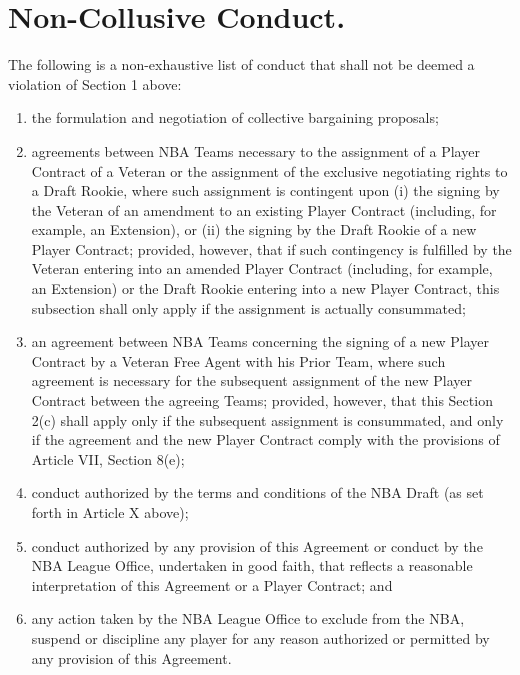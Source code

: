 \documentclass[
]{book}
\providecommand{\tightlist}{%
  \setlength{\itemsep}{0pt}\setlength{\parskip}{0pt}}
\begin{document}
\hypertarget{non-collusive-conduct.}{%
\section{Non-Collusive Conduct.}\label{non-collusive-conduct.}}

The following is a non-exhaustive list of conduct that shall not be deemed a violation of Section 1 above:

\begin{enumerate}
\def\labelenumi{(\alph{enumi})}
\tightlist
\item
  the formulation and negotiation of collective bargaining proposals;
\item
  agreements between NBA Teams necessary to the assignment of a Player Contract of a Veteran or the assignment of the exclusive negotiating rights to a Draft Rookie, where such assignment is contingent upon (i) the signing by the Veteran of an amendment to an existing Player Contract (including, for example, an Extension), or (ii) the signing by the Draft Rookie of a new Player Contract; provided, however, that if such contingency is fulfilled by the Veteran entering into an amended Player Contract (including, for example, an Extension) or the Draft Rookie entering into a new Player Contract, this subsection shall only apply if the assignment is actually consummated;
\item
  an agreement between NBA Teams concerning the signing of a new Player Contract by a Veteran Free Agent with his Prior Team, where such agreement is necessary for the subsequent assignment of the new Player Contract between the agreeing Teams; provided, however, that this Section 2(c) shall apply only if the subsequent assignment is consummated, and only if the agreement and the new Player Contract comply with the provisions of Article VII, Section 8(e);
\item
  conduct authorized by the terms and conditions of the NBA Draft (as set forth in Article X above);
\item
  conduct authorized by any provision of this Agreement or conduct by the NBA League Office, undertaken in good faith, that reflects a reasonable interpretation of this Agreement or a Player Contract; and
\item
  any action taken by the NBA League Office to exclude from the NBA, suspend or discipline any player for any reason authorized or permitted by any provision of this Agreement.
\end{enumerate}
\end{document}
